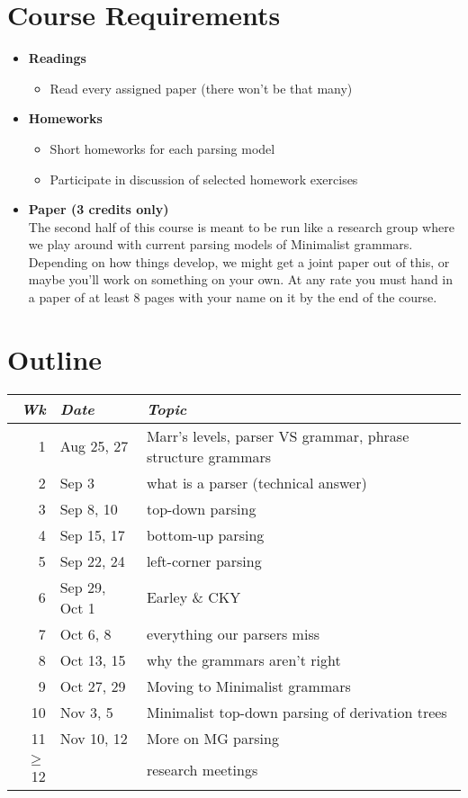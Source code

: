 \section{Course Requirements}
\begin{itemize}
    \item\textbf{Readings}
        \begin{itemize}
            \item Read every assigned paper (there won't be that many)
        \end{itemize}
    \item \textbf{Homeworks}
        \begin{itemize}
            \item Short homeworks for each parsing model
            \item Participate in discussion of selected homework exercises
        \end{itemize}
    \item \textbf{Paper (3 credits only)}\\
        The second half of this course is meant to be run like a research group where we play around with current parsing models of Minimalist grammars.
        Depending on how things develop, we might get a joint paper out of this, or maybe you'll work on something on your own.
        At any rate you must hand in a paper of at least 8 pages with your name on it by the end of the course.
\end{itemize}

\section{Outline}

\begin{longtable}{rlp{10cm}}
    \emph{Wk} & \emph{Date} & \emph{Topic}\\\hline
    1 & Aug 25, 27 & Marr's levels, parser VS grammar, phrase structure grammars\\
    2 & Sep 3 & what is a parser (technical answer)\\
    3 & Sep 8, 10 & top-down parsing\\
    4 & Sep 15, 17 & bottom-up parsing\\
    5 & Sep 22, 24 & left-corner parsing\\
    6 & Sep 29, Oct 1 & Earley \& CKY\\
    7 & Oct 6, 8 & everything our parsers miss\\
    8 & Oct 13, 15 &  why the grammars aren't right\\
    9 & Oct 27, 29 & Moving to Minimalist grammars\\
    10 & Nov 3, 5 & Minimalist top-down parsing of derivation trees\\
    11 & Nov 10, 12 & More on MG parsing\\
    $\geq$12 & & research meetings
\end{longtable}
